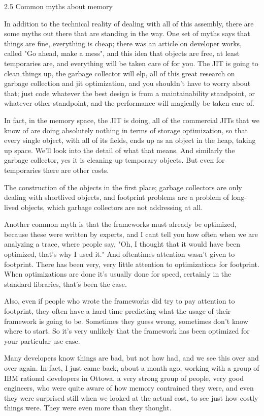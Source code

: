 \begin{itemize}
2.5 Common myths about memory

In addition to the technical reality of dealing with all of this assembly, there are some myths out there that are standing in the way.  One set of myths says that things are fine, everything is cheap; there was an article on developer works, called "Go ahead, make a mess",  and this idea that objects are free, at least temporaries are, and everything will be taken care of for you. The JIT is going to clean things up, the garbage collector will elp, all of this great research on garbage collection and jit optimization, and you shouldn't have to worry about that; just code whatever the best design is from a maintainability standpoint, or whatever other standpoint, and the performance will magically be taken care of.

In fact, in the memory space, the JIT is doing, all of the commercial JITs that we know of are doing absolutely nothing in terms of storage optimization, so that every single object, with all of its fields, ends up as an object in the heap, taking up space.  We'll look into the detail of what that means. And similarly the garbage collector, yes it is cleaning up temporary objects. But even for temporaries there are other costs. 

The construction of the objects in the first place; garbage collectors are only dealing with shortlived objects, and footprint problems are a problem of long-lived objects, which garbage collectors are not addressing at all.

Another common myth is that the frameworks must already be optimized, because these were written by experts, and I cant tell you how often when we are analyzing a trace, where people say, "Oh, I thought that it would have been optimized, that's why I used it." And oftentimes attention wasn't given to footprint. There has been very, very little attention to optimizations for footprint.  When optimizations are done it's usually done for speed, certainly in the standard libraries, that's been the case.

Also, even if people who wrote the frameworks did try to pay attention to footprint, they often have a hard time predicting what the usage of their framework is going to be. Sometimes they guess wrong, sometimes don't know where to start.  So it's very unlikely that the framework has been optimized for your particular use case. 

Many developers know things are bad, but not how had, and we see this over and over again. In fact, I just came back, about a month ago, working with a group of IBM rational developers in Ottowa, a very strong group of people, very good engineers, who were quite aware of how memory contrained they were, and even they were surprised still when we looked at the actual cost, to see just how costly things were. They were even more than they thought.


\end{itemize}
